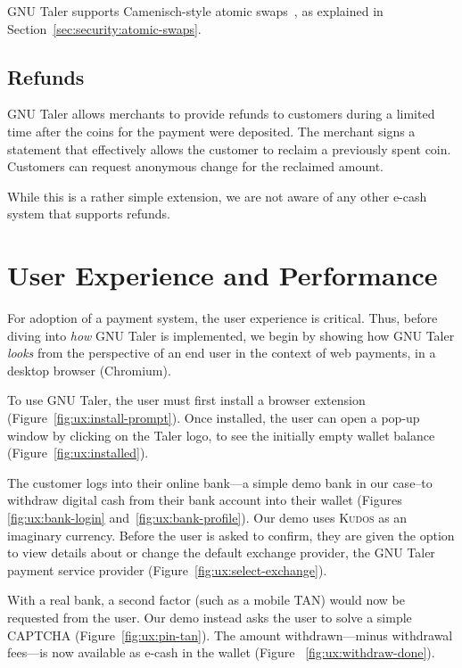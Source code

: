 GNU Taler supports Camenisch-style atomic swaps~\cite{camenisch2007endorsed},
as explained in Section~\ref{sec:security:atomic-swaps}.

\subsection{Refunds}

GNU Taler allows merchants to provide refunds to customers during a limited
time after the coins for the payment were deposited.  The merchant signs a
statement that effectively allows the customer to reclaim a previously spent
coin.  Customers can request anonymous change for the reclaimed amount.

While this is a rather simple extension, we are not aware of any other e-cash
system that supports refunds.


\section{User Experience and Performance} \label{sec:intro:ux}

For adoption of a payment system, the user experience is critical. Thus,
before diving into {\em how} GNU Taler is implemented, we begin by 
showing how GNU Taler {\em looks} from the perspective of an end user in the
context of web payments, in a desktop browser (Chromium).

To use GNU Taler, the user must first install a browser extension
(Figure~\ref{fig:ux:install-prompt}).  Once installed, the user can
open a pop-up window by clicking on the Taler logo, to see the
initially empty wallet balance (Figure~\ref{fig:ux:installed}).

The customer logs into their online bank---a simple demo bank in our case--to
withdraw digital cash from their bank account into their wallet (Figures~%
\ref{fig:ux:bank-login} and~\ref{fig:ux:bank-profile}).  Our demo uses
\textsc{Kudos} as an imaginary currency.  Before the user is asked to confirm,
they are given the option to view details about or change the default exchange
provider, the GNU Taler payment service provider (Figure~\ref{fig:ux:select-exchange}).

With a real bank, a second factor (such as a mobile TAN) would now be requested
from the user.  Our demo instead asks the user to solve a simple CAPTCHA
(Figure~\ref{fig:ux:pin-tan}).  The amount withdrawn---minus withdrawal
fees---is now available as e-cash in the wallet (Figure~%
\ref{fig:ux:withdraw-done}).


